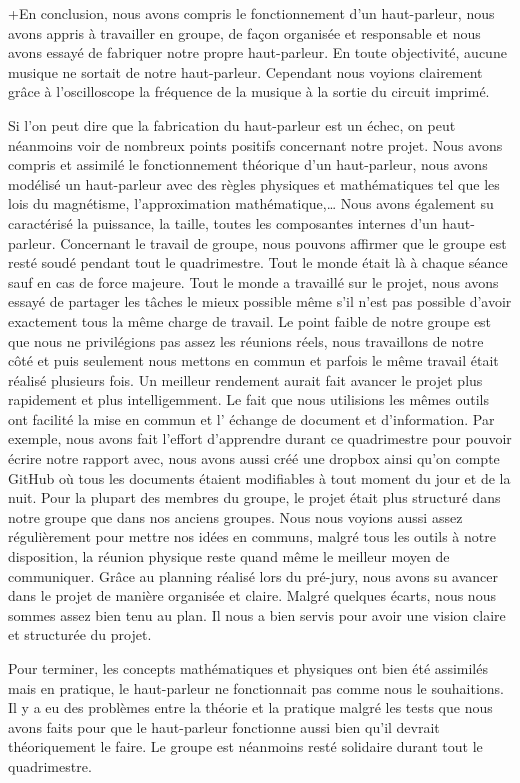 

+En conclusion, nous avons compris le fonctionnement d’un haut-parleur, 
nous avons appris à travailler en groupe, de façon organisée et responsable
et nous avons essayé de fabriquer notre propre haut-parleur. 
En toute objectivité, aucune musique ne sortait de notre haut-parleur.  
Cependant nous voyions clairement grâce à l’oscilloscope la fréquence de 
la musique à la sortie du circuit imprimé.


Si l’on peut dire que la fabrication du haut-parleur est un échec, on peut
néanmoins voir de nombreux points positifs concernant notre projet.
Nous avons compris et assimilé le fonctionnement théorique d’un haut-parleur, 
nous avons modélisé un haut-parleur avec des règles physiques et mathématiques 
tel que les lois du magnétisme, l’approximation mathématique,…  Nous avons également
su caractérisé la puissance, la taille, toutes les composantes internes d’un haut-parleur. 
Concernant le travail de groupe, nous pouvons affirmer que le groupe est resté soudé
pendant tout le quadrimestre.  Tout le monde était là à chaque séance sauf en cas
de force majeure.  Tout le monde a travaillé sur le projet, nous avons essayé de
partager les tâches le mieux possible même s’il n’est pas possible d’avoir 
exactement tous la même charge de travail.  Le point faible de notre groupe est 
que nous ne privilégions pas assez les réunions réels, nous travaillons de notre 
côté et puis seulement nous mettons en commun et parfois le même travail était 
réalisé plusieurs fois.  Un meilleur rendement aurait fait avancer le projet plus 
rapidement et plus intelligemment. 
Le fait que nous utilisions les mêmes outils ont facilité la mise en commun et l’
échange de document et d’information. Par exemple, nous avons fait l’effort d’apprendre 
\latex{} durant ce quadrimestre pour pouvoir écrire notre rapport avec, nous avons aussi
créé une dropbox ainsi qu’on compte GitHub où tous les documents étaient modifiables à 
tout moment du jour et de la nuit.  Pour la plupart des membres du groupe, le projet était 
plus structuré dans notre groupe que dans nos anciens groupes.  Nous nous voyions aussi 
assez régulièrement pour mettre nos idées en communs, malgré tous les outils à notre 
disposition, la réunion physique reste quand même le meilleur moyen de communiquer.
Grâce au planning réalisé lors du pré-jury, nous avons su avancer dans le projet de manière
organisée et claire.  Malgré quelques écarts, nous nous sommes assez bien tenu au plan.
Il  nous a bien servis pour avoir une vision claire et structurée du projet. 


Pour terminer, les concepts mathématiques et physiques ont bien été assimilés mais en 
pratique, le haut-parleur ne fonctionnait pas comme nous le souhaitions.  Il y a eu des
problèmes entre la théorie et la pratique malgré les tests que nous avons faits pour que 
le haut-parleur fonctionne aussi bien qu’il devrait théoriquement le faire.  Le groupe 
est néanmoins resté solidaire durant tout le quadrimestre.


